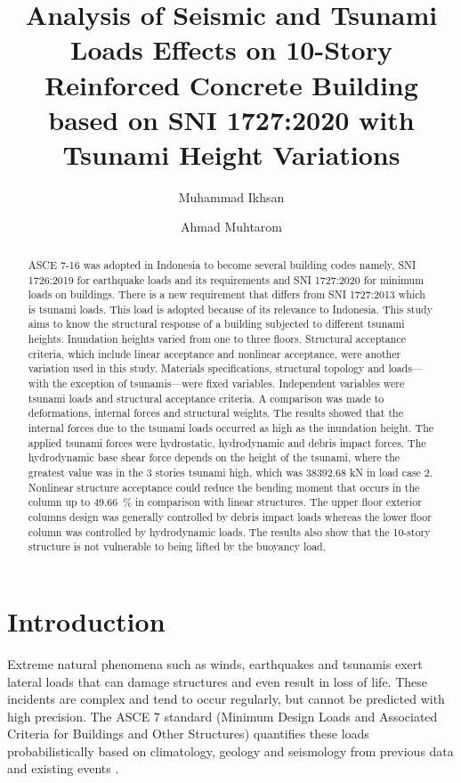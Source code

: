 \documentclass{cup-pan}
\title{Analysis of Seismic and Tsunami Loads Effects on 10-Story Reinforced Concrete Building based on SNI 1727:2020 with Tsunami Height Variations}
\author[1]{Muhammad Ikhsan}
\author[1]{Ahmad Muhtarom}
\affil[1]{Department Civil Engineering and Planning, Sriwijaya University, Jl. Raya Prabumulih – KM 32, Indralaya, Ogan Ilir, South Sumatera. Email: \url{sipil@ft.unsri.ac.id}}
\begin{document}
\maketitle

\begin{abstract}
ASCE 7-16 was adopted in Indonesia to become several building codes namely, SNI 1726:2019 for earthquake loads and its requirements and SNI 1727:2020 for minimum loads on buildings. There is a new requirement that differs from SNI 1727:2013 which is tsunami loads. This load is adopted because of its relevance to Indonesia. This study aims to know the structural response of a building subjected to different tsunami heights. Inundation heights varied from one to three floors. Structural acceptance criteria, which include linear acceptance and nonlinear acceptance, were another variation used in this study. Materials specifications, structural topology and loads—with the exception of tsunamis—were fixed variables. Independent variables were tsunami loads and structural acceptance criteria. A comparison was made to deformations, internal forces and structural weights. The results showed that the internal forces due to the tsunami loads occurred as high as the inundation height. The applied tsunami forces were hydrostatic, hydrodynamic and debris impact forces. The hydrodynamic base shear force depends on the height of the tsunami, where the greatest value was in the 3 stories tsunami high, which was \num{38392.68} kN in load case 2. Nonlinear structure acceptance could reduce the bending moment that occurs in the column up to \SI{49.66}{\percent} in comparison with linear structures. The upper floor exterior columns design was generally controlled by debris impact loads whereas the lower floor column was controlled by hydrodynamic loads. The results also show that the 10-story structure is not vulnerable to being lifted by the buoyancy load.



\end{abstract}

\section{Introduction}
\label{sec:overview}

Extreme natural phenomena such as winds, earthquakes and tsunamis exert lateral loads that can damage structures and even result in loss of life. These incidents are complex and tend to occur regularly, but cannot be predicted with high precision. The ASCE 7 standard (Minimum Design Loads and Associated Criteria for Buildings and Other Structures) quantifies these loads probabilistically based on climatology, geology and seismology from previous data and existing events \citep{leet}.
\end{document}
